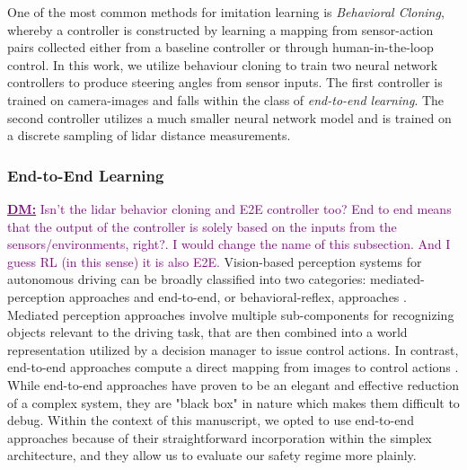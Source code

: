 \documentclass[manuscript,screen,review]{acmart}
\newcommand{\todo}[1]{\textcolor{red}{\textbf{\underline{TODO:}} #1}}
\newcommand{\diego}[1]{\textcolor{purple}{\textbf{\underline{DM:}} #1}}
\begin{document}
One of the most common methods for imitation learning is \textit{Behavioral Cloning}, whereby a controller is constructed by learning a mapping from sensor-action pairs collected either from a baseline controller or through human-in-the-loop control. 
In this work, we utilize behaviour cloning to train two neural network controllers to produce steering angles from sensor inputs. The first controller is trained on camera-images and falls within the class of \textit{end-to-end learning}. The second controller utilizes a much smaller neural network model and is trained on a discrete sampling of lidar distance measurements.%

\subsubsection{End-to-End Learning}
\diego{Isn't the lidar behavior cloning and E2E controller too? End to end means that the output of the controller is solely based on the inputs from the sensors/environments, right?. I would change the name of this subsection. And I guess RL (in this sense) it is also E2E.}
Vision-based perception systems for autonomous driving can be broadly classified into two categories: mediated-perception approaches and end-to-end, or behavioral-reflex, approaches \cite{DeepDrive2015}. Mediated perception approaches involve multiple sub-components for recognizing objects relevant to the driving task, that are then combined into a world representation utilized by a decision manager to issue control actions. In contrast, end-to-end approaches compute a direct mapping from images to control actions \cite{DeepDrive2015}. While end-to-end approaches have proven to be an elegant and effective reduction of a complex system, they are "black box" in nature which makes them difficult to debug. Within the context of this manuscript, we opted to use end-to-end approaches because of their straightforward incorporation within the simplex architecture, and they allow us to evaluate our safety regime more plainly.
\end{document}
